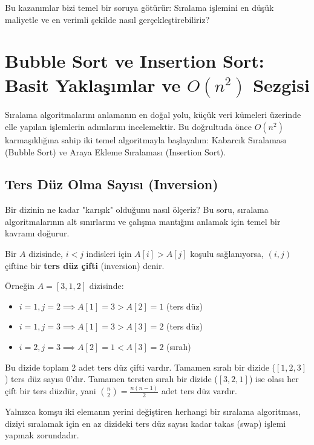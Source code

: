 Bu kazanımlar bizi temel bir soruya götürür: Sıralama işlemini en düşük maliyetle ve en verimli şekilde nasıl gerçekleştirebiliriz?

\section{Bubble Sort ve Insertion Sort: Basit Yaklaşımlar ve $O(n^2)$ Sezgisi}

Sıralama algoritmalarını anlamanın en doğal yolu, küçük veri kümeleri üzerinde elle yapılan işlemlerin adımlarını incelemektir. Bu doğrultuda önce $O(n^2)$ karmaşıklığına sahip iki temel algoritmayla başlayalım: Kabarcık Sıralaması (Bubble Sort) ve Araya Ekleme Sıralaması (Insertion Sort).

\subsection{Ters Düz Olma Sayısı (Inversion)}

Bir dizinin ne kadar "karışık" olduğunu nasıl ölçeriz? Bu soru, sıralama algoritmalarının alt sınırlarını ve çalışma mantığını anlamak için temel bir kavramı doğurur.

\begin{definition}
Bir $A$ dizisinde, $i < j$ indisleri için $A[i] > A[j]$ koşulu sağlanıyorsa, $(i, j)$ çiftine bir \textbf{ters düz çifti} (inversion) denir.
\end{definition}

Örneğin $A = [3, 1, 2]$ dizisinde:
\begin{itemize}
    \item $i=1, j=2 \implies A[1] = 3 > A[2] = 1$ (ters düz)
    \item $i=1, j=3 \implies A[1] = 3 > A[3] = 2$ (ters düz)
    \item $i=2, j=3 \implies A[2] = 1 < A[3] = 2$ (sıralı)
\end{itemize}
Bu dizide toplam $2$ adet ters düz çifti vardır. Tamamen sıralı bir dizide ($[1, 2, 3]$) ters düz sayısı $0$'dır. Tamamen tersten sıralı bir dizide ($[3, 2, 1]$) ise olası her çift bir ters düzdür, yani $\binom{n}{2} = \frac{n(n-1)}{2}$ adet ters düz vardır.

\begin{theorem}
Yalnızca komşu iki elemanın yerini değiştiren herhangi bir sıralama algoritması, diziyi sıralamak için en az dizideki ters düz sayısı kadar takas (swap) işlemi yapmak zorundadır.
\end{theorem}

